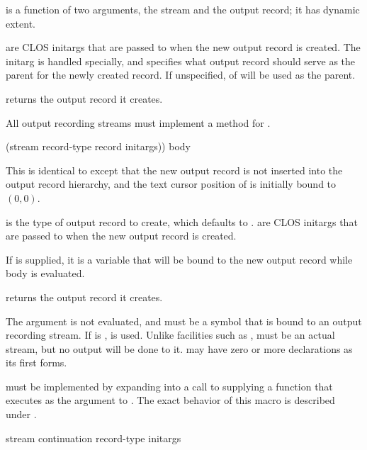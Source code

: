  is a function of two arguments, the stream and the output
record; it has dynamic extent.

 are CLOS initargs that are passed to  when the
new output record is created.  The  initarg is handled specially,
and specifies what output record should serve as the parent for the newly
created record.  If unspecified,  of
 will be used as the parent.

 returns the output record it creates.

All output recording streams must implement a method for
.


 {(stream \optional record-type record
                                           \rest initargs))
                                          \body body}

This is identical to  except that the new output record
is not inserted into the output record hierarchy, and the text cursor position
of  is initially bound to $(0,0)$.

 is the type of output record to create, which defaults to
.   are CLOS initargs that are
passed to  when the new output record is created.

If  is supplied, it is a variable that will be bound to the new
output record while body is evaluated.

 returns the output record it creates.

The  argument is not evaluated, and must be a symbol that is bound to
an output recording stream.  If  is ,  is
used.  Unlike facilities such as ,  must be
an actual stream, but no output will be done to it.   may have zero or
more declarations as its first forms.

 must be implemented by expanding into a call
to  supplying a function that executes
 as the  argument to
.  The exact behavior of this macro is
described under .

 {stream continuation record-type 
                                                   \rest initargs \key}

